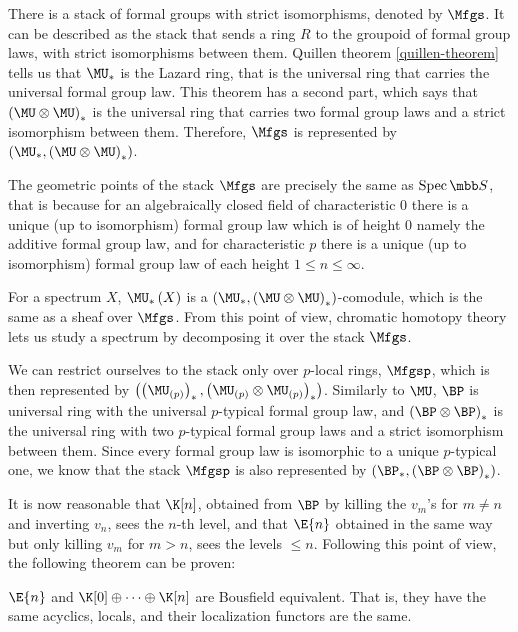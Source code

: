 There is a stack of formal groups with strict isomorphisms, denoted by $\Mfgs$.
It can be described as the stack that sends a ring $R$ to the groupoid of formal group laws, with strict isomorphisms between them.
Quillen theorem \ref{quillen-theorem} tells us that $\MU_*$ is the Lazard ring, that is the universal ring that carries the universal formal group law.
This theorem has a second part, which says that $\left(\MU \otimes \MU\right)_*$ is the universal ring that carries two formal group laws and a strict isomorphism between them.
Therefore, $\Mfgs$ is represented by $\left(\MU_*, \left(\MU \otimes \MU\right)_*\right)$.

The geometric points of the stack $\Mfgs$ are precisely the same as $\spec \SS$, that is because for an algebraically closed field of characteristic $0$ there is a unique (up to isomorphism) formal group law which is of height $0$ namely the additive formal group law, and for characteristic $p$ there is a unique (up to isomorphism) formal group law of each height $1 \leq n \leq \infty$.

For a spectrum $X$, $\MU_*\left(X\right)$ is a $\left(\MU_*, \left(\MU \otimes \MU\right)_*\right)$-comodule, which is the same as a sheaf over $\Mfgs$.
From this point of view, chromatic homotopy theory lets us study a spectrum by decomposing it over the stack $\Mfgs$.

We can restrict ourselves to the stack only over $p$-local rings, $\Mfgsp$, which is then represented by $\left(\left(\MU_{\left(p\right)}\right)_*, \left(\MU_{\left(p\right)} \otimes \MU_{\left(p\right)}\right)_*\right)$.
Similarly to $\MU$, $\BP$ is universal ring with the universal $p$-typical formal group law, and $\left(\BP \otimes \BP\right)_*$ is the universal ring with two $p$-typical formal group laws and a strict isomorphism between them.
Since every formal group law is isomorphic to a unique $p$-typical one, we know that the stack $\Mfgsp$ is also represented by $\left(\BP_*, \left(\BP \otimes \BP\right)_*\right)$.

It is now reasonable that $\K[n]$, obtained from $\BP$ by killing the $v_m$'s for $m \neq n$ and inverting $v_n$, sees the $n$-th level, and that $\E{n}$ obtained in the same way but only killing $v_m$ for $m > n$, sees the levels $\leq n$.
Following this point of view, the following theorem can be proven:

\begin{theorem}
	$\E{n}$ and $\K[0] \oplus \cdots \oplus \K[n]$ are Bousfield equivalent.
	That is, they have the same acyclics, locals, and their localization functors are the same.
\end{theorem}

